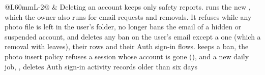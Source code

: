 \begin{longtable}{@{}L{60mm}L{\dimexpr\linewidth-60mm-2\tabcolsep\relax}@{}}
   & Deleting an account keeps only safety reports.  runs the new , which the owner also runs for email requests and removals. It refuses while any photo file is left in the user's folder, no longer bans the email of a hidden or suspended account, and deletes any ban on the user's email except a  one (which a removal with  leaves), their  rows and their Auth sign-in flows.  keeps a  ban, the photo insert policy refuses a session whose account is gone (), and a new daily job, , deletes Auth sign-in activity records older than six days \\
\end{longtable}
\endgroup
